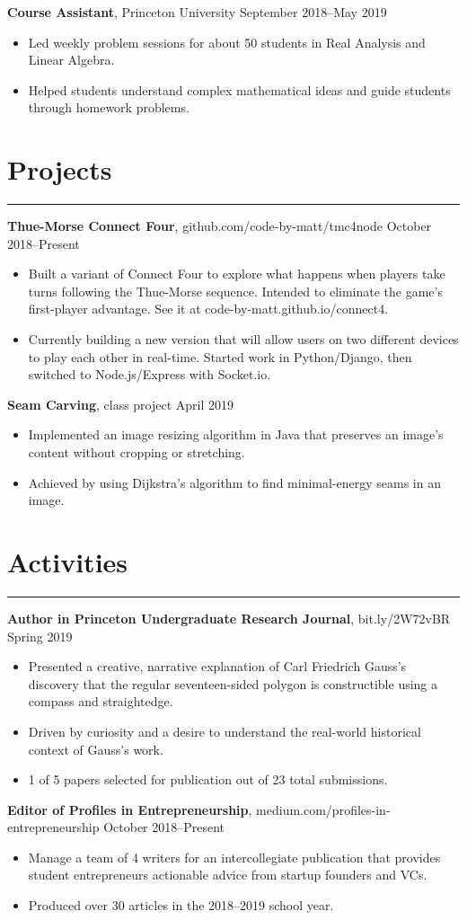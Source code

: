 \documentclass[11pt]{article}
\newcommand{\resumesection}[1]{\vspace{-0.2cm}\section*{#1}\vspace{-0.2cm}\hrule\vspace{0.2cm}}
\begin{document}
\textbf{Course Assistant}, Princeton University \hfill September 2018--May 2019
\begin{itemize}
	\item Led weekly problem sessions for about 50 students in Real Analysis and Linear Algebra.
	\item Helped students understand complex mathematical ideas and guide students through homework problems.
\end{itemize}

\resumesection{Projects}

\textbf{Thue-Morse Connect Four}, github.com/code-by-matt/tmc4node  \hfill October 2018--Present
\begin{itemize}
	\item Built a variant of Connect Four to explore what happens when players take turns following the Thue-Morse sequence. Intended to eliminate the game's first-player advantage. See it at code-by-matt.github.io/connect4.
	\item Currently building a new version that will allow users on two different devices to play each other in real-time. Started work in Python/Django, then switched to Node.js/Express with Socket.io.
\end{itemize}

\textbf{Seam Carving}, class project \hfill April 2019
\begin{itemize}
	\item Implemented an image resizing algorithm in Java that preserves an image's content without cropping or stretching.
	\item Achieved by using Dijkstra's algorithm to find minimal-energy seams in an image.
\end{itemize}

\resumesection{Activities}

\textbf{Author in Princeton Undergraduate Research Journal}, bit.ly/2W72vBR \hfill Spring 2019
\begin{itemize}
	\item Presented a creative, narrative explanation of Carl Friedrich Gauss's discovery that the regular seventeen-sided polygon is constructible using a compass and straightedge.
	\item Driven by curiosity and a desire to understand the real-world historical context of Gauss's work.
	\item 1 of 5 papers selected for publication out of 23 total submissions.
\end{itemize}

\textbf{Editor of Profiles in Entrepreneurship}, medium.com/profiles-in-entrepreneurship \hfill October 2018--Present
\begin{itemize}
	\item Manage a team of 4 writers for an intercollegiate publication that provides student entrepreneurs actionable advice from startup founders and VCs.
	\item Produced over 30 articles in the 2018--2019 school year.
\end{itemize}
\end{document}
